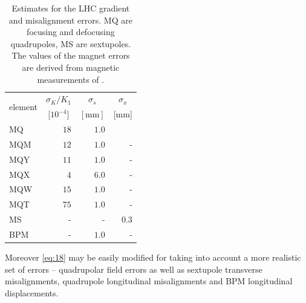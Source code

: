 \begin{table}
	\centering
	\begin{tabular}{lrrr}
		\multirow{ 2}{*}{element} & \multicolumn{1}{c}{ $ \sigma_K/K_1 $ }&\multicolumn{1}{c}{ $ \sigma_s $ }&\multicolumn{1}{c}{ $ \sigma_x $}\\
		&\multicolumn{1}{c}{  [$ 10^{-4} $]} &\multicolumn{1}{c}{  $ [\text{mm}] $} &\multicolumn{1}{c}{  [mm]} \rule[-3mm]{0mm}{0mm} \\ 
		\hline
		MQ & $18  $ & $ 1.0   $ &\rule[5mm]{0mm}{0mm}\\
		MQM & $ 12 $ & $ 1.0   $ & -\\
		MQY & $ 11 $ & $ 1.0  $ & -\\
		MQX &  $4   $ & $ 6.0   $  & -\\
		MQW & $ 15  $ & $ 1.0   $  & -\\
		MQT & $ 75  $ & $ 1.0   $  & -\\
		MS & -& - & $ 0.3   $ \\
		BPM & -& $ 1.0   $ & - 
	\end{tabular}
	\caption{Estimates for the LHC gradient and misalignment errors. MQ are focusing and defocusing quadrupoles, MS are sextupoles. The values of the magnet errors are derived from magnetic measurements of \cite{ref:15} \cite{ref:16} . }
	\label{tab:unc_estimates}
\end{table}

Moreover \eqref{eq:18} may be easily modified for taking into account a more realistic set of errors -- quadrupolar field errors as well as sextupole transverse misalignments, quadrupole longitudinal misalignments and BPM longitudinal displacements. 


